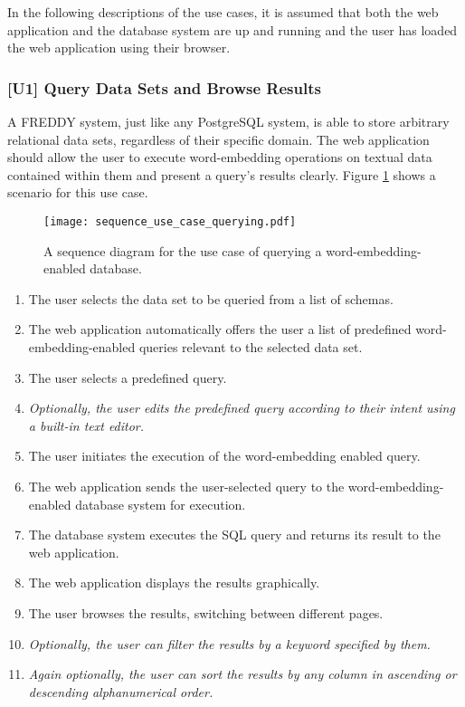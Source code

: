 In the following descriptions of the use cases, it is assumed that both the web application and the database system are up and running and the user has loaded the web application using their browser.

\subsubsection{[U1] Query Data Sets and Browse Results}

A FREDDY system, just like any PostgreSQL system, is able to store arbitrary relational data sets, regardless of their specific domain. The web application should allow the user to execute word-embedding operations on textual data contained within them and present a query's results clearly. Figure \ref{fig:use_case_querying} shows a scenario for this use case.
\begin{figure}
	\centering\texttt{[image: sequence\_use\_case\_querying.pdf]}
	\caption{A sequence diagram for the use case of querying a word-embedding-enabled database.}
	\label{fig:use_case_querying}
\end{figure}
\begin{enumerate}
	\item The user selects the data set to be queried from a list of schemas.
	\item The web application automatically offers the user a list of predefined word-embedding-enabled queries relevant to the selected data set.
	\item The user selects a predefined query.
	\item \textit{Optionally, the user edits the predefined query according to their intent using a built-in text editor.}
	\item The user initiates the execution of the word-embedding enabled query.
	\item The web application sends the user-selected query to the word-embedding-enabled database system for execution.
	\item The database system executes the SQL query and returns its result to the web application.
	\item The web application displays the results graphically.
	\item The user browses the results, switching between different pages.
	\item \textit{Optionally, the user can filter the results by a keyword specified by them.}
	\item \textit{Again optionally, the user can sort the results by any column in ascending or descending alphanumerical order.}
\end{enumerate}

